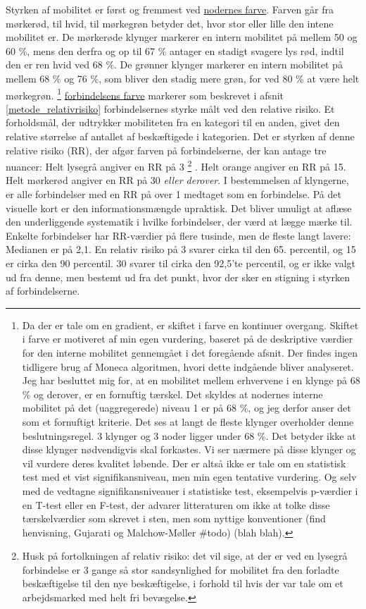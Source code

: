 Styrken af mobilitet er først og fremmest ved \underline{nodernes farve}. Farven går fra mørkerød, til hvid, til mørkegrøn betyder det, hvor stor eller lille den intene mobilitet er. De mørkerøde klynger markerer en intern mobilitet på mellem 50 og 60 \%, mens den derfra og op til 67 \% antager en stadigt svagere lys rød, indtil den er ren hvid ved 68 \%. De grønner klynger markerer en intern mobilitet på mellem 68 \% og 76 \%, som bliver den stadig mere grøn, for ved 80 \% at være helt mørkegrøn.
%
\footnote{Da der er tale om en gradient, er skiftet i farve en kontinuer overgang. Skiftet i farve er motiveret af min egen vurdering, baseret på de deskriptive værdier for den interne mobilitet gennemgået i det foregående afsnit. Der findes ingen tidligere brug af Moneca algoritmen, hvori dette indgående bliver analyseret. Jeg har besluttet mig for, at en mobilitet mellem erhvervene i en klynge på 68 \% og derover, er en fornuftig tærskel. Det skyldes at nodernes interne mobilitet på det (uaggregerede) niveau 1 er på 68 \%, og jeg derfor anser det som et fornuftigt kriterie. Det ses at langt de fleste klynger overholder denne beslutningsregel. 3 klynger og 3 noder ligger under 68 \%. Det betyder ikke at disse klynger nødvendigvis skal forkastes. Vi ser nærmere på disse klynger og vil vurdere deres kvalitet løbende. Der er altså ikke er tale om en statistisk test med et vist signifikansniveau, men min egen tentative vurdering. Og selv med de vedtagne signifikansniveauer i statistiske test, eksempelvis p-værdier i en T-test eller en F-test,  der advarer litteraturen om ikke at tolke disse tærskelværdier som skrevet i sten, men som nyttige konventioner (find henvisning, Gujarati og Malchow-Møller \#todo) (blah blah).}%
%
\underline{forbindelsens farve} markerer som beskrevet i afsnit \ref{metode_relativrisiko} forbindelsernes styrke målt ved den relative risiko. Et forholdsmål, der udtrykker mobiliteten fra en kategori til en anden, givet den relative størrelse af antallet af beskæftigede i kategorien. Det er styrken af denne relative risiko (RR), der afgør farven på forbindelserne, der kan antage tre nuancer: Helt lysegrå angiver en RR på 3%
%
\footnote{Husk på fortolkningen af relativ risiko:  det vil sige, at der er ved en lysegrå forbindelse er 3 gange så stor sandsynlighed for mobilitet fra den forladte beskæftigelse til den nye beskæftigelse, i forhold til hvis der var tale om et arbejdsmarked med helt fri bevægelse.}%
%
. Helt orange angiver en RR på 15. Helt mørkerød angiver en RR på 30 \emph{ eller derover}. I bestemmelsen af klyngerne, er alle forbindelser med en RR på over 1 medtaget som en forbindelse. På det visuelle kort er den informationsmængde upraktisk. Det bliver umuligt at aflæse den underliggende systematik i hvilke forbindelser, der værd at lægge mærke til. Enkelte forbindelser har RR-værdier på flere tusinde, men de fleste langt lavere: Medianen er på 2,1. En relativ risiko på 3 svarer cirka til den 65. percentil, og 15 er cirka den 90 percentil. 30 svarer til cirka den 92,5'te percentil, og er ikke valgt ud fra denne, men bestemt ud fra det punkt, hvor der sker en stigning i styrken af forbindelserne. 

